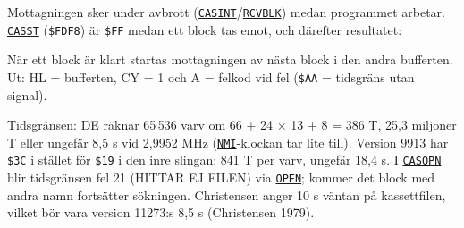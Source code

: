 \begin{Listing}
\Gap
{}
\begin{Note}\par\noindent Mottagningen sker under avbrott (\hyperlink{l:CASINT}{\texttt{CASINT}}/\hyperlink{l:RCVBLK}{\texttt{RCVBLK}}) medan programmet arbetar. \hyperlink{v:CASST}{\texttt{CASST}} (\texttt{\$FDF8}) är \texttt{\$FF} medan ett block tas emot, och därefter resultatet:\par
\begin{Verb}
\end{Verb}
\par\noindent När ett block är klart startas mottagningen av nästa block i den andra bufferten. Ut: HL = bufferten, CY = 1 och A = felkod vid fel (\texttt{\$AA} = tidsgräns utan signal).\par
\par\noindent Tidsgränsen: DE räknar 65\,536 varv om 66 + 24 × 13 + 8 = 386 T, 25,3 miljoner T eller ungefär 8,5 s vid 2,9952 MHz (\hyperlink{l:NMI}{\texttt{NMI}}-klockan tar lite till). Version 9913 har \texttt{\$3C} i stället för \texttt{\$19} i den inre slingan: 841 T per varv, ungefär 18,4 s. I \hyperlink{l:CASOPN}{\texttt{CASOPN}} blir tidsgränsen fel 21 (HITTAR EJ FILEN) via \hyperlink{l:OPEN}{\texttt{OPEN}}; kommer det block med andra namn fortsätter sökningen. Christensen anger 10 s väntan på kassettfilen, vilket bör vara version 11273:s 8,5 s (Christensen 1979).\par\end{Note}

\end{Listing}
